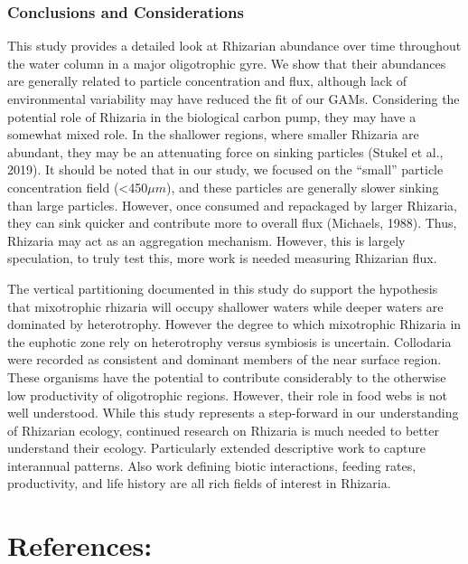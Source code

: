 \documentclass[
]{article}
\begin{document}
\hypertarget{conclusions-and-considerations}{%
\subsubsection{Conclusions and
Considerations}\label{conclusions-and-considerations}}

This study provides a detailed look at Rhizarian abundance over time
throughout the water column in a major oligotrophic gyre. We show that
their abundances are generally related to particle concentration and
flux, although lack of environmental variability may have reduced the
fit of our GAMs. Considering the potential role of Rhizaria in the
biological carbon pump, they may have a somewhat mixed role. In the
shallower regions, where smaller Rhizaria are abundant, they may be an
attenuating force on sinking particles (Stukel et al., 2019). It should
be noted that in our study, we focused on the ``small'' particle
concentration field (\textless450\(\mu m\)), and these particles are
generally slower sinking than large particles. However, once consumed
and repackaged by larger Rhizaria, they can sink quicker and contribute
more to overall flux (Michaels, 1988). Thus, Rhizaria may act as an
aggregation mechanism. However, this is largely speculation, to truly
test this, more work is needed measuring Rhizarian flux.

The vertical partitioning documented in this study do support the
hypothesis that mixotrophic rhizaria will occupy shallower waters while
deeper waters are dominated by heterotrophy. However the degree to which
mixotrophic Rhizaria in the euphotic zone rely on heterotrophy versus
symbiosis is uncertain. Collodaria were recorded as consistent and
dominant members of the near surface region. These organisms have the
potential to contribute considerably to the otherwise low productivity
of oligotrophic regions. However, their role in food webs is not well
understood. While this study represents a step-forward in our
understanding of Rhizarian ecology, continued research on Rhizaria is
much needed to better understand their ecology. Particularly extended
descriptive work to capture interannual patterns. Also work defining
biotic interactions, feeding rates, productivity, and life history are
all rich fields of interest in Rhizaria.

\hypertarget{references}{%
\section{References:}\label{references}}
\end{document}
